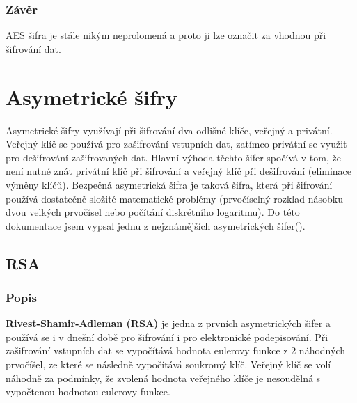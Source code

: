 \documentclass[12pt, a4paper]{article}
\begin{document}
		\subsubsection{Závěr}
		AES šifra je stále nikým neprolomená a proto ji lze označit za vhodnou při šifrování dat.
		
\section{Asymetrické šifry}
Asymetrické šifry využívají při šifrování dva odlišné klíče, veřejný a privátní. Veřejný klíč se používá pro zašifrování vstupních dat, zatímco privátní se využit pro dešifrování zašifrovaných dat. Hlavní výhoda těchto šifer spočívá v tom, že není nutné znát privátní klíč při šifrování a veřejný klíč při dešifrování (eliminace výměny klíčů). Bezpečná asymetrická šifra je taková šifra, která při šifrování používá dostatečně složité matematické problémy (prvočíselný rozklad násobku dvou velkých prvočísel nebo počítání diskrétního logaritmu). Do této dokumentace jsem vypsal jednu z nejznámějších asymetrických šifer(). 
\label{sec:asym}
	\subsection{RSA}
	\label{subsec:rsa}
		\subsubsection{Popis}
		\textbf{Rivest-Shamir-Adleman (RSA)} je jedna z prvních asymetrických šifer a používá se i v dnešní době pro šifrování i pro elektronické podepisování. Při zašifrování vstupních dat se vypočítává hodnota eulerovy funkce z 2 náhodných prvočíšel, ze které se následně vypočítává soukromý klíč. Veřejný klíč se volí náhodně za podmínky, že zvolená hodnota veřejného klíče je nesoudělná s vypočtenou hodnotou eulerovy funkce.
\end{document}
